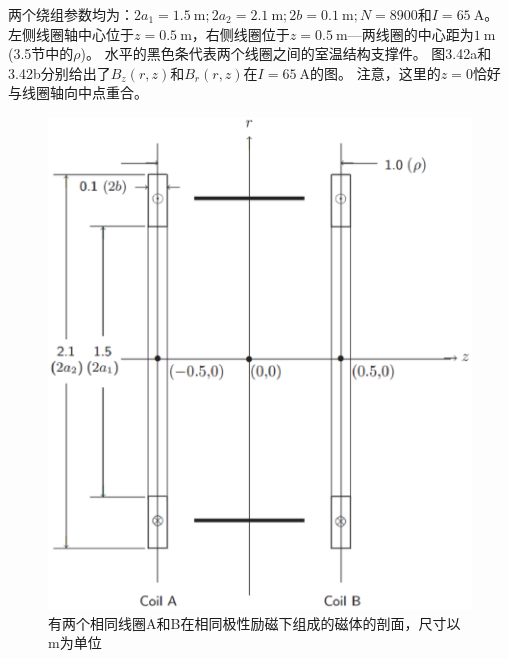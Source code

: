 两个绕组参数均为：$2a_1 = 1.5\ \mathrm{m}; 2a_2 = 2.1\ \mathrm{m}; 2b = 0.1\ \mathrm{m};
N =8900$和$I =65\ \mathrm{A}$。
左侧线圈轴中心位于$z=0.5\ \mathrm{m}$，右侧线圈位于$z = 0.5 \ \mathrm{m}$---两线圈的中心距为$1\ \mathrm{m}$ (3.5节中的$\rho$)。
水平的黑色条代表两个线圈之间的室温结构支撑件。
图3.42a和3.42b分别给出了$B_z(r, z)$和$B_r(r, z)$在$I =65\ \mathrm{A}$的图。
注意，这里的$z=0$恰好与线圈轴向中点重合。
\begin{figure}[htbp]
	\centering
	\includegraphics[scale=0.5]{chpt3/figs/fig3.41.eps}
	\caption{有两个相同线圈A和B在相同极性励磁下组成的磁体的剖面，尺寸以m为单位}
\end{figure}

